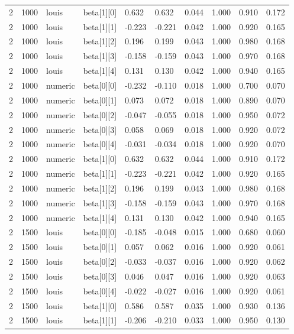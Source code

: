 \begin{table}
\begin{tabular}{llllllllll}
2 & 1000 & louis & beta[1][0] & 0.632 & 0.632 & 0.044 & 1.000 & 0.910 & 0.172 \\
2 & 1000 & louis & beta[1][1] & -0.223 & -0.221 & 0.042 & 1.000 & 0.920 & 0.165 \\
2 & 1000 & louis & beta[1][2] & 0.196 & 0.199 & 0.043 & 1.000 & 0.980 & 0.168 \\
2 & 1000 & louis & beta[1][3] & -0.158 & -0.159 & 0.043 & 1.000 & 0.970 & 0.168 \\
2 & 1000 & louis & beta[1][4] & 0.131 & 0.130 & 0.042 & 1.000 & 0.940 & 0.165 \\
2 & 1000 & numeric & beta[0][0] & -0.232 & -0.110 & 0.018 & 1.000 & 0.700 & 0.070 \\
2 & 1000 & numeric & beta[0][1] & 0.073 & 0.072 & 0.018 & 1.000 & 0.890 & 0.070 \\
2 & 1000 & numeric & beta[0][2] & -0.047 & -0.055 & 0.018 & 1.000 & 0.950 & 0.072 \\
2 & 1000 & numeric & beta[0][3] & 0.058 & 0.069 & 0.018 & 1.000 & 0.920 & 0.072 \\
2 & 1000 & numeric & beta[0][4] & -0.031 & -0.034 & 0.018 & 1.000 & 0.920 & 0.070 \\
2 & 1000 & numeric & beta[1][0] & 0.632 & 0.632 & 0.044 & 1.000 & 0.910 & 0.172 \\
2 & 1000 & numeric & beta[1][1] & -0.223 & -0.221 & 0.042 & 1.000 & 0.920 & 0.165 \\
2 & 1000 & numeric & beta[1][2] & 0.196 & 0.199 & 0.043 & 1.000 & 0.980 & 0.168 \\
2 & 1000 & numeric & beta[1][3] & -0.158 & -0.159 & 0.043 & 1.000 & 0.970 & 0.168 \\
2 & 1000 & numeric & beta[1][4] & 0.131 & 0.130 & 0.042 & 1.000 & 0.940 & 0.165 \\
2 & 1500 & louis & beta[0][0] & -0.185 & -0.048 & 0.015 & 1.000 & 0.680 & 0.060 \\
2 & 1500 & louis & beta[0][1] & 0.057 & 0.062 & 0.016 & 1.000 & 0.920 & 0.061 \\
2 & 1500 & louis & beta[0][2] & -0.033 & -0.037 & 0.016 & 1.000 & 0.920 & 0.062 \\
2 & 1500 & louis & beta[0][3] & 0.046 & 0.047 & 0.016 & 1.000 & 0.920 & 0.063 \\
2 & 1500 & louis & beta[0][4] & -0.022 & -0.027 & 0.016 & 1.000 & 0.920 & 0.061 \\
2 & 1500 & louis & beta[1][0] & 0.586 & 0.587 & 0.035 & 1.000 & 0.930 & 0.136 \\
2 & 1500 & louis & beta[1][1] & -0.206 & -0.210 & 0.033 & 1.000 & 0.950 & 0.130 \\

\end{tabular}
\end{table}
